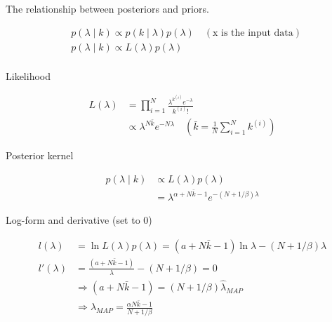 \documentclass{article}
\theoremstyle{definition}
\theoremstyle{remark}
\begin{document}
\begin{enumerate}[font={\Large\bfseries},left=0pt]
\begin{tcolorbox}
\begin{enumerate}
\begin{enumerate}
        The relationship between posteriors and priors.
        
        \begin{align}
            &p(\lambda \mid k) \propto p(k \mid \lambda)p(\lambda) \quad (\text{x is the input data}) \\
            &p(\lambda \mid k ) \propto L(\lambda)p(\lambda)\\
        \end{align}
        
        Likelihood
        
        \begin{align}
             L(\lambda) &= \prod_{i = 1}^{N} \frac{\lambda^{k^{(i)}}e^{-\lambda}}{k^{(i)}!}\\
                        &\propto \lambda^{N\bar{k}}e^{-N\lambda} \quad (\bar{k} = \frac{1}{N}\sum^N_{i = 1} k^{(i)})
        \end{align}
        
        Posterior kernel
        
        \begin{align}
        p(\lambda \mid k ) &\propto L(\lambda)p(\lambda) \\
                           &=\lambda^{\alpha + N\bar{k} - 1} e^{-(N + 1 / \beta)\lambda} 
        \end{align}
        
        Log-form and derivative (set to 0)
        
        \begin{align}
            l(\lambda) &= \ln L(\lambda)p(\lambda) = (a + N\bar{k} - 1)\ln \lambda - (N + 1/\beta)\lambda \\
            l'(\lambda) &= \frac{(a + N\bar{k} - 1)}{\lambda} - (N + 1/\beta) = 0\\ 
            &\Rightarrow (a + N\bar{k} - 1) = (N + 1/\beta) \hat{\lambda}_{MAP}\\
            &\Rightarrow \hat{\lambda}_{{MAP}} = \frac{\alpha N\bar{k} - 1}{N + 1/\beta}
        \end{align}
        

\end{enumerate}
\end{enumerate}
\end{tcolorbox}
\end{enumerate}
\end{document}
